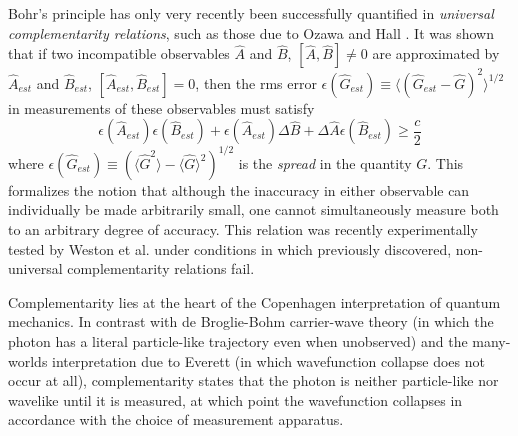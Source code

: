 Bohr's principle has only very recently been successfully quantified in \emph{universal complementarity relations}, such as those due to Ozawa and Hall \cite{Hall2004, Ozawa2003}. It was shown that if two incompatible observables $\hat{A}$ and $\hat{B}$, $[\hat{A}, \hat{B}]\ne0$ are approximated by $\hat{A}_{est}$ and $\hat{B}_{est}$,  $[\hat{A}_{est}, \hat{B}_{est}]=0$, then the rms error $\epsilon(\hat{G}_{est}) \equiv \langle(\hat{G}_{est} - \hat{G})^2\rangle ^{1/2}$ in measurements of these observables must satisfy
\begin{equation}
    \epsilon(\hat{A}_{est})  
    \epsilon(\hat{B}_{est})  
    +
    \epsilon(\hat{A}_{est})  
    \Delta \hat{B}
    +
    \Delta \hat{A}
    \epsilon(\hat{B}_{est})  
    \ge \frac{c}{2}
    \label{eqn:universal-complementarity}
\end{equation}
where $\epsilon(\hat{G}_{est}) \equiv (\langle\hat{G}^2\rangle - \langle\hat{G}\rangle^2) ^{1/2}$ is the \emph{spread} in the quantity $G$. This formalizes the notion that although the inaccuracy in either observable can individually be made arbitrarily small, one cannot simultaneously measure both to an arbitrary degree of accuracy. This relation was recently experimentally tested by Weston et al. \cite{Weston2013} under conditions in which previously discovered, non-universal complementarity relations fail.

Complementarity lies at the heart of the Copenhagen interpretation of quantum mechanics. In contrast with de Broglie-Bohm carrier-wave theory \cite{Bohm1995} (in which the photon has a literal particle-like trajectory even when unobserved) and the many-worlds interpretation due to Everett \cite{Everett1956} (in which wavefunction collapse does not occur at all), complementarity states that the photon is neither particle-like nor wavelike until it is measured, at which point the wavefunction collapses in accordance with the choice of measurement apparatus.

